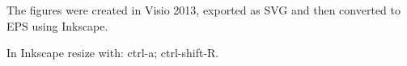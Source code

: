 The figures were created in Visio 2013, exported as SVG and then converted to EPS using Inkscape.

In Inkscape resize with: ctrl-a; ctrl-shift-R.


